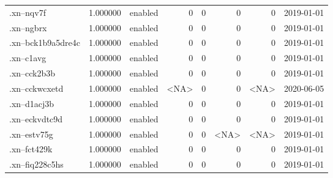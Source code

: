 \begin{tabular}{lrlrrrrl}
.xn--nqv7f                &          1.000000 &         enabled &                           0 &                           0 &                           0 &                   0 &           2019-01-01 \\
.xn--ngbrx                &          1.000000 &         enabled &                           0 &                           0 &                           0 &                   0 &           2019-01-01 \\
.xn--bck1b9a5dre4c        &          1.000000 &         enabled &                           0 &                           0 &                           0 &                   0 &           2019-01-01 \\
.xn--c1avg                &          1.000000 &         enabled &                           0 &                           0 &                           0 &                   0 &           2019-01-01 \\
.xn--cck2b3b              &          1.000000 &         enabled &                           0 &                           0 &                           0 &                   0 &           2019-01-01 \\
.xn--cckwcxetd            &          1.000000 &         enabled &                        <NA> &                           0 &                           0 &                <NA> &           2020-06-05 \\
.xn--d1acj3b              &          1.000000 &         enabled &                           0 &                           0 &                           0 &                   0 &           2019-01-01 \\
.xn--eckvdtc9d            &          1.000000 &         enabled &                           0 &                           0 &                           0 &                   0 &           2019-01-01 \\
.xn--estv75g              &          1.000000 &         enabled &                           0 &                           0 &                        <NA> &                <NA> &           2019-01-01 \\
.xn--fct429k              &          1.000000 &         enabled &                           0 &                           0 &                           0 &                   0 &           2019-01-01 \\
.xn--fiq228c5hs           &          1.000000 &         enabled &                           0 &                           0 &                           0 &                   0 &           2019-01-01 \\

\end{tabular}
